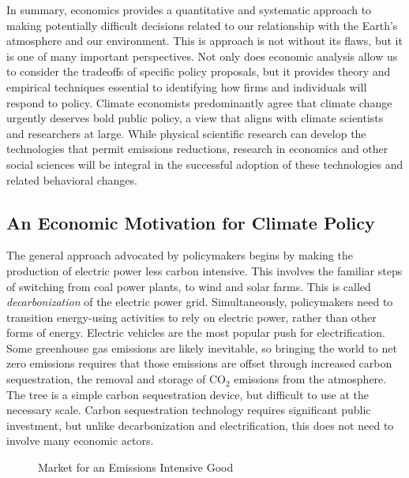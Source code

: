 In summary, economics provides a quantitative and systematic approach to making potentially difficult decisions related to our relationship with the Earth's atmosphere and our environment. This is approach is not without its flaws, but it is one of many important perspectives. Not only does economic analysis allow us to consider the tradeoffs of specific policy proposals, but it provides theory and empirical techniques essential to identifying how firms and individuals will respond to policy. Climate economists predominantly agree that climate change urgently deserves bold public policy, a view that aligns with climate scientists and researchers at large. While physical scientific research can develop the technologies that permit emissions reductions, research in economics and other social sciences will be integral in the successful adoption of these technologies and related behavioral changes.


\subsection{An Economic Motivation for Climate Policy}

The general approach advocated by policymakers begins by making the production of electric power less carbon intensive. This involves the familiar steps of switching from coal power plants, to wind and solar farms. This is called \emph{decarbonization} of the electric power grid. Simultaneously, policymakers need to transition energy-using activities to rely on electric power, rather than other forms of energy. Electric vehicles are the most popular push for electrification. Some greenhouse gas emissions are likely inevitable, so bringing the world to net zero emissions requires that those emissions are offset through increased carbon sequestration, the removal and storage of CO$_2$ emissions from the atmosphere. The tree is a simple carbon sequestration device, but difficult to use at the necessary scale. Carbon sequestration technology requires significant public investment, but unlike decarbonization and electrification, this does not need to involve many economic actors.

\begin{figure}
\caption{Market for an Emissions Intensive Good}
\centering
{}
\end{figure}


